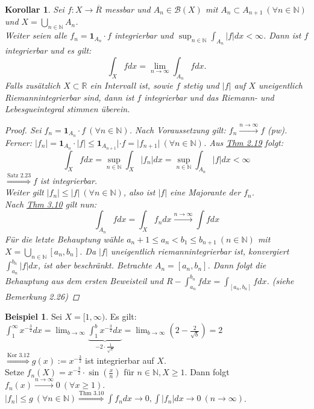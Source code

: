 \documentclass[a4paper]{report}
\newcommand{\doubleOne}{\textbf{1}}
\newcommand{\R}{\mathbb{R}}
\newcommand{\N}{\mathbb{N}}
\newcommand{\Borel}{\mathcal{B}}
\newcommand{\toInf}{\rightarrow \infty}
\newcommand{\limToInf}[1]{\lim_{#1 \toInf}}
\newcommand{\jlabel}[1]{\label{j_#1}}
\newcommand{\jshortlink}[1]{\jhyperref{#1}{\text{#1}}}
\newcommand{\jhyperref}[2]{\hyperref[j_#1]{#2}}
\newcommand{\jlink}[1]{\jhyperref{#1}{#1}}
\newcommand{\jabb}[3]{ #1: #2 \rightarrow #3 }
\theoremstyle{plain}
\newtheorem{kor}[thm]{Korollar}
\theoremstyle{definition}
\newtheorem*{expl*}{Beispiel}
\begin{document}
{{{{\begin{kor}
\jlabel{Kor 3.12}
    Sei $\jabb{f}{X}{\overline{R}}$ messbar und $A_n \in \Borel(X)$ mit $A_n \subset A_{n+1} \ (\forall n\in\N)$ und $X = \bigcup_{n\in\N} A_n$.\\
    Weiter seien alle $f_n = \doubleOne_{A_n} \cdot f$ integrierbar und $\sup_{n\in\N} \int_{A_n} |f|dx < \infty$. Dann ist $f$ integrierbar und es gilt:
    \begin{displaymath}
        \int_{X}fdx = \limToInf{n} \int_{A_n} f dx.
    \end{displaymath}
    Falls zusätzlich $X\subset \R$ ein Intervall ist, sowie $f$ stetig und $|f|$ auf $X$ uneigentlich Riemannintegrierbar sind, dann ist $f$ integrierbar und das Riemann- und Lebesgueintegral stimmen überein.
    \begin{proof}
        Sei $f_n = \doubleOne_{A_n}\cdot f \ (\forall n\in\N)$. Nach Voraussetzung gilt: $f_n \xrightarrow{n\rightarrow \infty} f$ (pw). Ferner: $|f_n| = \doubleOne_{A_n}\cdot |f| \le \doubleOne_{A_{n+1}}|\cdot f = |f_{n+1}| \ (\forall n\in\N)$. Aus \jlink{Thm 2.19} folgt: 
        \begin{displaymath}
            \int_X f dx = \sup_{n\in\N} \int_X |f_n| dx = \sup_{n \in\N} \int_{A_n} |f| dx < \infty
        \end{displaymath}
        $\overset{\jshortlink{Satz 2.23}}{\Rightarrow} f$ ist integrierbar.\\
        Weiter gilt $|f_n| \le |f| \ (\forall n\in\N)$, also ist $|f|$ eine Majorante der $f_n$.\\
        Nach \jlink{Thm 3.10} gilt nun:
        \begin{displaymath}
            \int_{A_n} f dx = \int_X f_n dx \xrightarrow{n \rightarrow \infty} \int f dx
        \end{displaymath}
        Für die letzte Behauptung wähle $a_n+1 \le a_n < b_1 \le b_{n+1} \ (n \in\N)$ mit $X = \bigcup_{n\in\N} [a_n, b_n]$. Da $|f|$ uneigentlich riemannintegrierbar ist, konvergiert $\int_{a_n}^{b_n} |f| dx$, ist aber beschränkt. Betrachte $A_n = [a_n, b_n]$. Dann folgt die Behauptung aus dem ersten Beweisteil und $R-\int_{a_n}^{b_n} f dx = \int_{[a_n,b_n]} f dx$. (siehe Bemerkung 2.26)
    \end{proof}
\end{kor}

\begin{expl*}
    Sei $X = [1,\infty)$. Es gilt:\\
    $\int_1^\infty x^{-\frac{3}{2}}dx = \limToInf{b} \underbrace{\int_1^b x^{-\frac{3}{2}} dx}_{-2 \cdot \frac{1}{\sqrt{x}}} = \limToInf{b} \left( 2- \frac{2}{\sqrt{b}}\right) = 2$\\
    $\overset{\text{Kor 3.12}}{\Rightarrow} g(x) := x^{-\frac{3}{2}}$ ist integrierbar auf $X$.\\
    Setze $f_n(X) = x^{-\frac{3}{2}} \cdot \sin(\frac{x}{n})$ für $n\in\N, X \ge 1$. Dann folgt $f_n(x) \xrightarrow{n\rightarrow\infty} 0 \ (\forall x \ge 1)$. $|f_n| \le g \ (\forall n\in\N) \overset{\text{Thm 3.10}}{\Rightarrow} \int f_n dx \rightarrow 0, \int |f_n| dx \rightarrow 0 \ (n\rightarrow\infty)$.
\end{expl*}


}}}}
\end{document}

